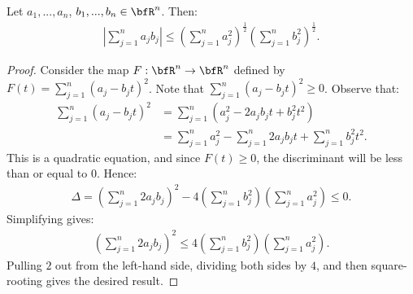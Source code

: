     \begin{proposition}\label{prop:cauchy-schwartz}
        Let $a_1,...,a_n$, $b_1,...,b_n \in \bfR^n$. Then:
            \begin{equation*}
            \begin{split}
                \left|\sum_{j=1}^n a_jb_j\right| \leq \left(\sum_{j=1}^n a_j^2\right)^\frac{1}{2} \left(\sum_{j=1}^n b_j^2\right)^\frac{1}{2}.
            \end{split}
            \end{equation*}
    \end{proposition}
        \begin{proof}
            Consider the map $F:\bfR^n \rightarrow \bfR^n$ defined by $F(t) = \sum_{j=1}^n(a_j - b_j t)^2$. Note that $\sum_{j=1}^n(a_j - b_j t)^2 \geq 0$. Observe that:
                \begin{equation*}
                \begin{split}
                    \sum_{j=1}^n(a_j - b_j t)^2
                    & = \sum_{j=1}^n(a_j^2 - 2a_jb_j t + b_j^2t^2) \\
                    & = \sum_{j=1}^n a_j^2 - \sum_{j=1}^n2a_jb_j t + \sum_{j=1}^n b_j^2 t^2.
                \end{split}
                \end{equation*}
            This is a quadratic equation, and since $F(t) \geq 0 $, the discriminant will be less than or equal to 0. Hence:
                \begin{equation*}
                \begin{split}
                    \Delta = \left(\sum_{j=1}^n2a_jb_j\right)^2 - 4 \left(\sum_{j=1}^n b_j^2\right) \left(\sum_{j=1}^na_j^2\right) \leq 0.
                \end{split}
                \end{equation*}
            Simplifying gives:
                \begin{equation*}
                \begin{split}
                    \left(\sum_{j=1}^n2a_jb_j\right)^2 \leq 4\left(\sum_{j=1}^n b_j^2\right) \left(\sum_{j=1}^na_j^2\right).
                \end{split}
                \end{equation*}
            Pulling $2$ out from the left-hand side, dividing both sides by $4$, and then square-rooting gives the desired result.
        \end{proof}
    
